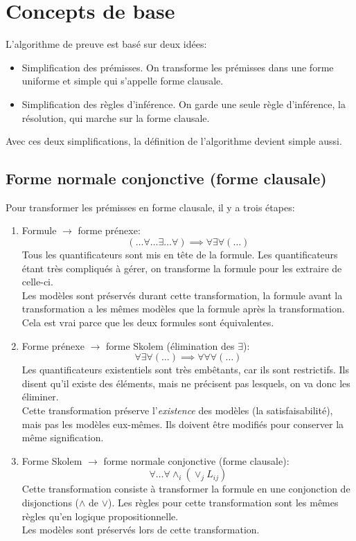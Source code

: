 {\section{Concepts de base}

L'algorithme de preuve est basé sur deux idées:
\begin{itemize}
\item Simplification des prémisses.
On transforme les prémisses dans une forme uniforme et simple qui s'appelle forme clausale.
\item Simplification des règles d'inférence.
On garde une seule règle d'inférence, la résolution, qui marche sur la forme clausale.
\end{itemize}
Avec ces deux simplifications, la définition de l'algorithme devient simple aussi.

\subsection{Forme normale conjonctive (forme clausale)} 

Pour transformer les prémisses en forme clausale, il y a trois étapes:
\begin{enumerate}
    \item Formule $\to$ forme prénexe: $$(\ldots{}\forall{}\ldots{}\exists{}\ldots{}\forall{} )\implies \forall{}\exists{}\forall{}(\ldots{})$$
    Tous les quantificateurs sont mis en tête de la formule. Les quantificateurs étant très compliqués à gérer, on transforme la formule pour les extraire de celle-ci. \\
    Les modèles sont préservés durant cette transformation, la formule avant la transformation a les mêmes modèles
    que la formule après la transformation.
    Cela est vrai parce que les deux formules sont équivalentes.
    \item Forme prénexe $\to$ forme Skolem (élimination des $\exists{}$): $$ \forall{}\exists{}\forall{}(\ldots{})  \implies \forall{}\forall{}\forall{}(\ldots{}) $$
    Les quantificateurs existentiels sont très embêtants, car ils sont restrictifs. Ils disent qu'il existe des éléments, mais ne précisent pas lesquels, on va donc les éliminer. \\
    Cette transformation préserve l'{\em existence} des modèles (la satisfaisabilité),
    mais pas les modèles eux-mêmes. Ils doivent être modifiés pour conserver la même signification. 
    \item Forme Skolem $\to$ forme normale conjonctive (forme clausale):  
    \[\forall \ldots \forall \land_i(\lor_j L_{ij})\]
    Cette transformation consiste à transformer la formule en
    une conjonction de disjonctions ($\land$ de $\lor$). Les règles pour cette transformation sont
    les mêmes règles qu'en logique propositionnelle. \\
    Les modèles sont préservés lors de cette transformation. 
\end{enumerate}

}
